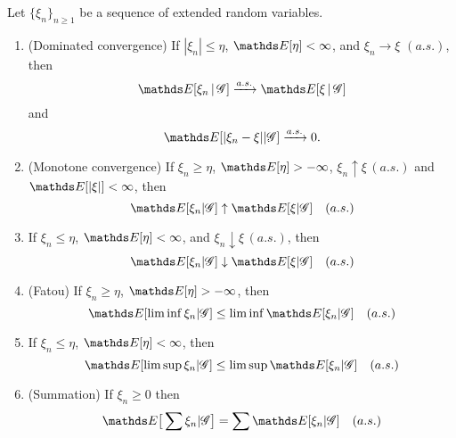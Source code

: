 \begin{property}
Let $\{ \xi_n \}_{n \ge 1}$ be a sequence of extended random variables.
\begin{enumerate}
    \item (Dominated convergence) If $|\xi_n| \le \eta$, $\E[\eta]<\infty$, and $\xi_n \to \xi$ $(a.s.)$, then
    \begin{equation*}
        \E[\xi_n \,|\, \G] \xrightarrow{a.s.} \E[\xi \,|\, \G]
    \end{equation*}
    and 
    \begin{equation*}
        \E[|\xi_n - \xi| | \G] \xrightarrow{a.s.} 0.
    \end{equation*}
    \item (Monotone convergence) If $\xi_n \ge \eta$, $\E[\eta] > -\infty$, $\xi_n \uparrow \xi \, (a.s.)$ and $\E[|\xi|] < \infty$, then
    \begin{equation*}
        \E[\xi_n | \G] \uparrow \E[\xi | \G] \quad (a.s.)
    \end{equation*}
    \item If $\xi_n \le \eta$, $\E[\eta] < \infty$, and $\xi_n \downarrow \xi \, (a.s.)$, then
    \begin{equation*}
        \E[\xi_n | \G] \downarrow \E[\xi | \G] \quad (a.s.)
    \end{equation*}
    \item (Fatou) If $\xi_n \ge \eta $, $\E[\eta] > - \infty$, then
    \begin{equation*}
        \E[\liminf \xi_n | \G] \le \liminf \E[\xi_n | \G] \quad (a.s.)
    \end{equation*}
    \item If $\xi_n \le \eta $, $\E[\eta] < \infty$, then
    \begin{equation*}
        \E[\limsup \xi_n | \G] \le \limsup \E[\xi_n | \G] \quad (a.s.)
    \end{equation*}
    \item (Summation) If $\xi_n \ge 0$ then
    \begin{equation*}
        \E\big[\sum \xi_n | \G \big] = \sum \E[\xi_n | \G] \quad (a.s.)
    \end{equation*}
\end{enumerate}
\end{property}

